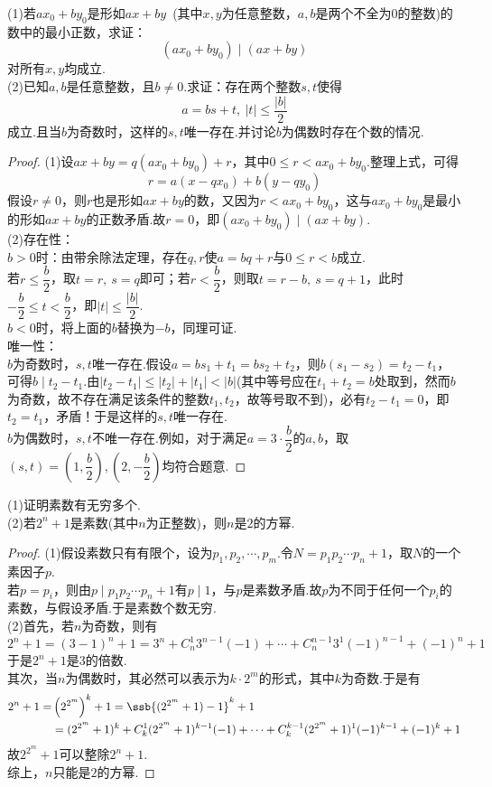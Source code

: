 \begin{example} %
	(1)若$ax_0+by_0$是形如$ax+by$~(其中$x,y$为任意整数，$a,b$是两个不全为$0$的整数)的数中的最小正数，求证：$$(ax_0+by_0) \mid (ax+by)$$对所有$x,y$均成立. \\
	(2)已知$a,b$是任意整数，且$b \neq 0$.求证：存在两个整数$s,t$使得$$a=bs+t,~|t| \leq \frac{|b|}{2}$$
	成立.且当$b$为奇数时，这样的$s,t$唯一存在.并讨论$b$为偶数时存在个数的情况.
\end{example}
\begin{proof}
	(1)设$ax+by=q(ax_0+by_0)+r$，其中$0 \leq r < ax_0+by_0$.整理上式，可得$$r=a(x-qx_0)+b(y-qy_0)$$
	假设$r \neq 0$，则$r$也是形如$ax+by$的数，又因为$r < ax_0+by_0$，这与$ax_0+by_0$是最小的形如$ax+by$的正数矛盾.故$r=0$，即$(ax_0+by_0) \mid (ax+by)$. \\
	(2)存在性： \\
	$b > 0$时：由带余除法定理，存在$q,r$使$a=bq+r$与$0 \leq r <b$成立. \\
	若$r \leq \dfrac{b}{2}$，取$t=r,~s=q$即可；若$r < \dfrac{b}{2}$，则取$t=r-b,~s=q+1$，此时$-\dfrac{b}{2} \leq t < \dfrac{b}{2}$，即$|t| \leq \dfrac{|b|}{2}$. \\
	$b < 0$时，将上面的$b$替换为$-b$，同理可证. \\
	唯一性：\\
	$b$为奇数时，$s,t$唯一存在.假设$a=bs_1+t_1=bs_2+t_2$，则$b(s_1-s_2)=t_2-t_1$，可得$b \mid t_2-t_1$.由$|t_2-t_1| \leq |t_2|+|t_1| < |b|$(其中等号应在$t_1+t_2=b$处取到，然而$b$为奇数，故不存在满足该条件的整数$t_1,t_2$，故等号取不到)，必有$t_2-t_1=0$，即$t_2=t_1$，矛盾！于是这样的$s,t$唯一存在. \\
	$b$为偶数时，$s,t$不唯一存在.例如，对于满足$a=3 \cdot \dfrac{b}{2}$的$a,b$，取$(s,t)=(1,\dfrac{b}{2}),(2,-\dfrac{b}{2})$均符合题意.
\end{proof}

\begin{example} %
	(1)证明素数有无穷多个. \\
	(2)若$2^n+1$是素数(其中$n$为正整数)，则$n$是$2$的方幂.
\end{example}
\begin{proof}
	(1)假设素数只有有限个，设为$p_1,p_2, \cdots ,p_m$.令$N=p_1p_2 \cdots p_n + 1$，取$N$的一个素因子$p$.\\
	若$p=p_i$，则由$p \mid p_1p_2\cdots p_n +1$有$p \mid 1$，与$p$是素数矛盾.故$p$为不同于任何一个$p_i$的素数，与假设矛盾.于是素数个数无穷. \\
	(2)首先，若$n$为奇数，则有$$2^n+1 = (3-1)^n+1 = 3^n + C_n^1 3^{n-1}(-1) + \cdots +C_n^{n-1} 3^1 (-1)^{n-1} + (-1)^n + 1$$
	于是$2^n+1$是$3$的倍数. \\
	其次，当$n$为偶数时，其必然可以表示为$k \cdot 2^m$的形式，其中$k$为奇数.于是有
	\begin{align*}
		2^n+1 = &\left( 2^{2^m} \right)^k + 1 = \ssb{ (2^{2^m}+1)-1 }^k + 1 \\
		&= (2^{2^m}+1)^k + C_k^1 (2^{2^m}+1)^{k-1}(-1) + \cdots + C_k^{k-1}(2^{2^m}+1)^1(-1)^{k-1} + (-1)^k + 1
	\end{align*}
	故$2^{2^m}+1$可以整除$2^n+1$. \\
	综上，$n$只能是$2$的方幂.
\end{proof}

